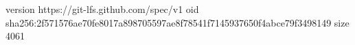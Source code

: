 version https://git-lfs.github.com/spec/v1
oid sha256:2f571576ae70fe8017a898705597ae8f78541f7145937650f4abce79f3498149
size 4061
